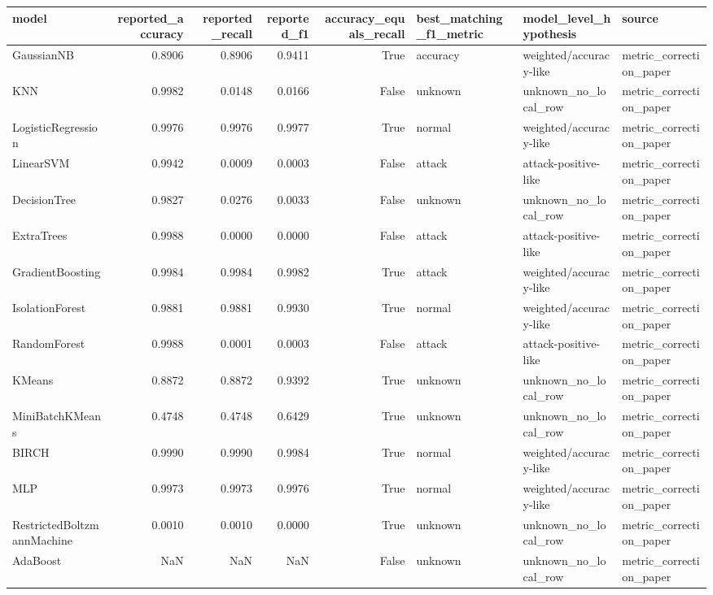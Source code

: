 \begin{tabular}{lrrrrlll}
\toprule
model & reported_accuracy & reported_recall & reported_f1 & accuracy_equals_recall & best_matching_f1_metric & model_level_hypothesis & source \\
\midrule
GaussianNB & 0.8906 & 0.8906 & 0.9411 & True & accuracy & weighted/accuracy-like & metric_correction_paper \\
KNN & 0.9982 & 0.0148 & 0.0166 & False & unknown & unknown_no_local_row & metric_correction_paper \\
LogisticRegression & 0.9976 & 0.9976 & 0.9977 & True & normal & weighted/accuracy-like & metric_correction_paper \\
LinearSVM & 0.9942 & 0.0009 & 0.0003 & False & attack & attack-positive-like & metric_correction_paper \\
DecisionTree & 0.9827 & 0.0276 & 0.0033 & False & unknown & unknown_no_local_row & metric_correction_paper \\
ExtraTrees & 0.9988 & 0.0000 & 0.0000 & False & attack & attack-positive-like & metric_correction_paper \\
GradientBoosting & 0.9984 & 0.9984 & 0.9982 & True & attack & weighted/accuracy-like & metric_correction_paper \\
IsolationForest & 0.9881 & 0.9881 & 0.9930 & True & normal & weighted/accuracy-like & metric_correction_paper \\
RandomForest & 0.9988 & 0.0001 & 0.0003 & False & attack & attack-positive-like & metric_correction_paper \\
KMeans & 0.8872 & 0.8872 & 0.9392 & True & unknown & unknown_no_local_row & metric_correction_paper \\
MiniBatchKMeans & 0.4748 & 0.4748 & 0.6429 & True & unknown & unknown_no_local_row & metric_correction_paper \\
BIRCH & 0.9990 & 0.9990 & 0.9984 & True & normal & weighted/accuracy-like & metric_correction_paper \\
MLP & 0.9973 & 0.9973 & 0.9976 & True & normal & weighted/accuracy-like & metric_correction_paper \\
RestrictedBoltzmannMachine & 0.0010 & 0.0010 & 0.0000 & True & unknown & unknown_no_local_row & metric_correction_paper \\
AdaBoost & NaN & NaN & NaN & False & unknown & unknown_no_local_row & metric_correction_paper \\
\bottomrule
\end{tabular}
